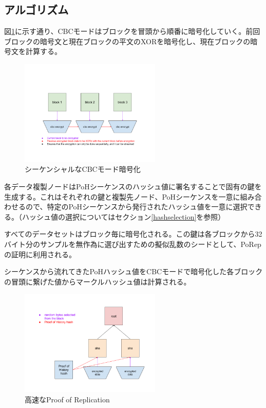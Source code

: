 \documentclass[12pt]{ltjsarticle}
\begin{document}
\subsection{アルゴリズム}
図\ref{fig:encrypt}に示す通り、CBCモードはブロックを冒頭から順番に暗号化していく。前回ブロックの暗号文と現在ブロックの平文のXORを暗号化し、現在ブロックの暗号文を計算する。

\begin{figure}
  \begin{center}
    \centering
    \includegraphics[width=0.6\textwidth]{../../figures/fig_7.png}
    \caption[図7]{シーケンシャルなCBCモード暗号化\label{fig:encrypt}}
  \end{center}
  \end{figure}

各データ複製ノードはPoHシーケンスのハッシュ値に署名することで固有の鍵を生成する。これはそれぞれの鍵と複製先ノード、PoHシーケンスを一意に組み合わせるので、特定のPoHシーケンスから発行されたハッシュ値を一意に選択できる。（ハッシュ値の選択についてはセクション\ref{hashselection}を参照）

すべてのデータセットはブロック毎に暗号化される。この鍵は各ブロックから32バイト分のサンプルを無作為に選び出すための擬似乱数のシードとして、PoRepの証明に利用される。

シーケンスから流れてきたPoHハッシュ値をCBCモードで暗号化した各ブロックの冒頭に繋げた値からマークルハッシュ値は計算される。

\begin{figure}
  \begin{center}
    \centering
    \includegraphics[width=0.6\textwidth]{../../figures/fig_8.png}
    \caption[図8]{高速なProof of Replication\label{fig_8}}
  \end{center}
  \end{figure}
\end{document}
